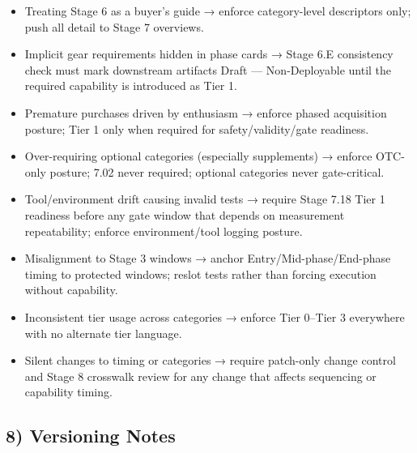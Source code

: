 \documentclass[10pt]{article}
\begin{document}
\begin{itemize}
\item Treating Stage 6 as a buyer’s guide → enforce category-level descriptors only; push all detail to Stage 7 overviews.
\item Implicit gear requirements hidden in phase cards → Stage 6.E consistency check must mark downstream artifacts Draft — Non-Deployable until the required capability is introduced as Tier 1.
\item Premature purchases driven by enthusiasm → enforce phased acquisition posture; Tier 1 only when required for safety/validity/gate readiness.
\item Over-requiring optional categories (especially supplements) → enforce OTC-only posture; 7.02 never required; optional categories never gate-critical.
\item Tool/environment drift causing invalid tests → require Stage 7.18 Tier 1 readiness before any gate window that depends on measurement repeatability; enforce environment/tool logging posture.
\item Misalignment to Stage 3 windows → anchor Entry/Mid-phase/End-phase timing to protected windows; reslot tests rather than forcing execution without capability.
\item Inconsistent tier usage across categories → enforce Tier 0–Tier 3 everywhere with no alternate tier language.
\item Silent changes to timing or categories → require patch-only change control and Stage 8 crosswalk review for any change that affects sequencing or capability timing.
\end{itemize}

\subsection*{8) Versioning Notes}
\end{document}
